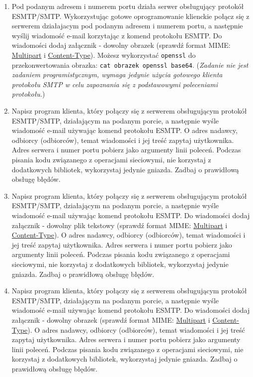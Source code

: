 \documentclass{article}
\begin{document}
\begin{enumerate}[label=\textbf{6.\arabic*}]
\item Pod podanym adresem i numerem portu działa serwer obsługujący protokół ESMTP/SMTP. Wykorzystując gotowe oprogramowanie klienckie połącz się z serwerem działajacym pod podanym adresem i numerem portu, a następnie wyślij wiadomość e-mail korzytając z komend protokołu ESMTP. Do wiadomości dodaj załącznik - dowolny obrazek (sprawdź format MIME: \href{https://www.w3.org/Protocols/rfc1341/7_2_Multipart.html}{Multipart} i \href{https://www.w3.org/Protocols/rfc1341/7_3_Message.html}{Content-Type}). Możesz wykorzystać \texttt{openssl} do przekonwertowania obrazka: \texttt{cat obrazek \textbar  openssl base64}. (\textit{Zadanie nie jest zadaniem programistycznym, wymaga jedynie użycia gotowego klienta protokołu SMTP w celu zapoznania się z podstawowymi poleceniami protokołu.})

\item Napisz program klienta, który połączy się z serwerem obsługującym protokół ESMTP/SMTP, działającym  na podanym porcie, a następnie wyśle wiadomość e-mail używając komend protokołu ESMTP. O adres nadawcy, odbiorcy (odbiorców), temat wiadomości i jej treść zapytaj użytkownika. Adres serwera i numer portu pobierz jako argumenty linii poleceń. Podczas pisania kodu związanego z operacjami sieciowymi, nie korzystaj z dodatkowych bibliotek, wykorzystaj jedynie gniazda. Zadbaj o prawidłową obsługę błędów. 

\item Napisz program klienta, który połączy się z serwerem obsługującym protokół ESMTP/SMTP, działającym  na podanym porcie, a następnie wyśle wiadomość e-mail używając komend protokołu ESMTP.  Do wiadomości dodaj załącznik - dowolny plik tekstowy (sprawdź format MIME: \href{https://www.w3.org/Protocols/rfc1341/7_2_Multipart.html}{Multipart} i \href{https://www.w3.org/Protocols/rfc1341/7_3_Message.html}{Content-Type}).  O adres nadawcy, odbiorcy (odbiorców), temat wiadomości i jej treść zapytaj użytkownika. Adres serwera i numer portu pobierz jako argumenty linii poleceń. Podczas pisania kodu związanego z operacjami sieciowymi, nie korzystaj z dodatkowych bibliotek, wykorzystaj jedynie gniazda. Zadbaj o prawidłową obsługę błędów. 

\item Napisz program klienta, który połączy się z serwerem obsługującym protokół ESMTP/SMTP, działającym  na podanym porcie, a następnie wyśle wiadomość e-mail używając komend protokołu ESMTP.  Do wiadomości dodaj załącznik - dowolny obrazek (sprawdź format MIME: \href{https://www.w3.org/Protocols/rfc1341/7_2_Multipart.html}{Multipart} i \href{https://www.w3.org/Protocols/rfc1341/7_3_Message.html}{Content-Type}).  O adres nadawcy, odbiorcy (odbiorców), temat wiadomości i jej treść zapytaj użytkownika. Adres serwera i numer portu pobierz jako argumenty linii poleceń. Podczas pisania kodu związanego z operacjami sieciowymi, nie korzystaj z dodatkowych bibliotek, wykorzystaj jedynie gniazda. Zadbaj o prawidłową obsługę błędów.


\end{enumerate}
\end{document}
